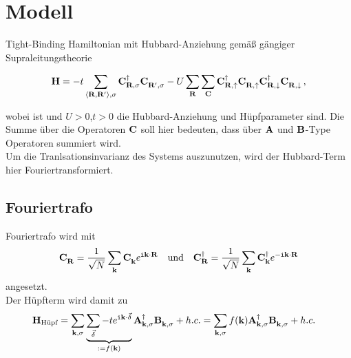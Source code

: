 \chapter{Modell}\label{sec:modell}

Tight-Binding Hamiltonian mit Hubbard-Anziehung gemäß gängiger Supraleitungstheorie

\begin{align}
    \oH = -t \sum_{\expval{\mb{R}, \mb{R'}}, \sigma} \ocd{\mb{R}, \sigma} \oc{\mb{R'}, \sigma} - U \sum_{\mb{R}} \sum_\oC \ocd{\mb{R}, \up} \oc{\mb{R},\up} \ocd{\mb{R},\down} \oc{\mb{R}, \down} \, ,
\end{align}

wobei 
ist und $U>0$,$t>0$ die Hubbard-Anziehung und Hüpfparameter sind. Die Summe über die Operatoren $\mathbf{C}$ soll hier bedeuten, dass über $\mathbf{A}$ und $\mathbf{B}$-Type Operatoren summiert wird.\\

Um die Tranlsationsinvarianz des Systems auszunutzen, wird der Hubbard-Term hier Fouriertransformiert.

\section{Fouriertrafo}

Fouriertrafo wird mit 
\begin{align}
    \oc{\mb{R}} = \frac{1}{\sqrt{N}} \sum_{\vk} \oc{\vk} e^{\im \vk \cdot \mb{R}} & & \text{und} & & \ocd{\mb{R}} = \frac{1}{\sqrt{N}} \sum_{\vk} \ocd{\vk} e^{-\im \vk \cdot \mb{R}}
\end{align}
angesetzt. \\

Der Hüpfterm wird damit zu 
\begin{align}
    \oH_{\text{Hüpf}} &= \sum_{\mb{k}, \sigma} \underbrace{\sum_{\bdelta} -t e^{\im \mb{k}\cdot \bdelta}}_{:= f(\mb{k}) } \oad{\mb{k}, \sigma} \ob{\mb{k}, \sigma} + h.c. = \sum_{\mb{k}, \sigma} f(\mb{k}) \oad{\mb{k}, \sigma} \ob{\mb{k}, \sigma} + h.c.
\end{align}

